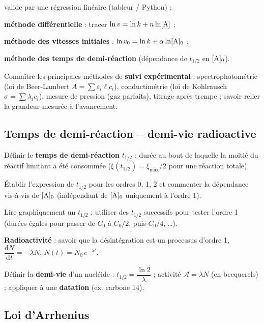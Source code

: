 \documentclass[11pt,a4paper]{article}
\newcommand{\conc}[1]{[\ce{#1}]}
\begin{document}
\begin{savoir}
\begin{savoir}
            valide par une régression linéaire (tableur / Python) ;
      \item \textbf{méthode différentielle} : tracer $\ln v = \ln k + n\ln\conc{A}$ ;
      \item \textbf{méthode des vitesses initiales} : $\ln v_0 = \ln k + \alpha\ln\conc{A}_0$ ;
      \item \textbf{méthode des temps de demi-réaction} (dépendance de $t_{1/2}$ en $\conc{A}_0$).
    \end{savoir}
  \item Connaître les principales méthodes de \textbf{suivi expérimental} :
        spectrophotométrie (loi de Beer-Lambert $A=\sum\varepsilon_i\ell c_i$),
        conductimétrie (loi de Kohlrausch $\sigma=\sum\lambda_i c_i$),
        mesure de pression (gaz parfaits), titrage après trempe ; savoir relier la grandeur mesurée
        à l'avancement.
\end{savoir}

\subsection{Temps de demi-réaction -- demi-vie radioactive}

\begin{savoir}
  \item Définir le \textbf{temps de demi-réaction} $t_{1/2}$ : durée au bout de laquelle la moitié
        du réactif limitant a été consommée ($\xi(t_{1/2}) = \xi_{\max}/2$ pour une réaction totale).
  \item Établir l'expression de $t_{1/2}$ pour les ordres 0, 1, 2 et commenter la dépendance
        vis-à-vis de $\conc{A}_0$ (indépendant de $\conc{A}_0$ uniquement à l'ordre 1).
  \item Lire graphiquement un $t_{1/2}$ ; utiliser des $t_{1/2}$ successifs pour tester l'ordre 1
        (durées égales pour passer de $C_0$ à $C_0/2$, puis $C_0/4$, \dots).
  \item \textbf{Radioactivité} : savoir que la désintégration est un processus d'ordre 1,
        $\dfrac{\mathrm{d}N}{\mathrm{d}t} = -\lambda N$, $N(t)=N_0\,e^{-\lambda t}$.
  \item Définir la \textbf{demi-vie} d'un nucléide : $t_{1/2}=\dfrac{\ln 2}{\lambda}$ ;
        activité $\mathcal{A}=\lambda N$ (en becquerels) ; appliquer à une \textbf{datation}
        (ex. carbone 14).
\end{savoir}

\subsection{Loi d'Arrhenius}
\end{document}
